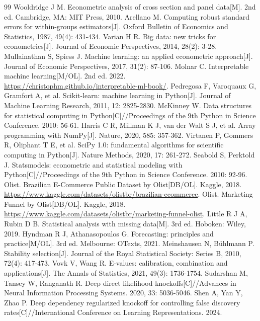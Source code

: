 \documentclass{sufethesismas}
\begin{document}
\begin{thebibliography}{99}
 Wooldridge J M. Econometric analysis of cross section and panel data[M]. 2nd ed. Cambridge, MA: MIT Press, 2010.
 Arellano M. Computing robust standard errors for within-groups estimators[J]. Oxford Bulletin of Economics and Statistics, 1987, 49(4): 431-434.
 Varian H R. Big data: new tricks for econometrics[J]. Journal of Economic Perspectives, 2014, 28(2): 3-28.
 Mullainathan S, Spiess J. Machine learning: an applied econometric approach[J]. Journal of Economic Perspectives, 2017, 31(2): 87-106.
 Molnar C. Interpretable machine learning[M/OL]. 2nd ed. 2022. \url{https://christophm.github.io/interpretable-ml-book/}.
 Pedregosa F, Varoquaux G, Gramfort A, et al. Scikit-learn: machine learning in Python[J]. Journal of Machine Learning Research, 2011, 12: 2825-2830.
 McKinney W. Data structures for statistical computing in Python[C]//Proceedings of the 9th Python in Science Conference. 2010: 56-61.
 Harris C R, Millman K J, van der Walt S J, et al. Array programming with NumPy[J]. Nature, 2020, 585: 357-362.
 Virtanen P, Gommers R, Oliphant T E, et al. SciPy 1.0: fundamental algorithms for scientific computing in Python[J]. Nature Methods, 2020, 17: 261-272.
 Seabold S, Perktold J. Statsmodels: econometric and statistical modeling with Python[C]//Proceedings of the 9th Python in Science Conference. 2010: 92-96.
 Olist. Brazilian E-Commerce Public Dataset by Olist[DB/OL]. Kaggle, 2018. \url{https://www.kaggle.com/datasets/olistbr/brazilian-ecommerce}.
 Olist. Marketing Funnel by Olist[DB/OL]. Kaggle, 2018. \url{https://www.kaggle.com/datasets/olistbr/marketing-funnel-olist}.
 Little R J A, Rubin D B. Statistical analysis with missing data[M]. 3rd ed. Hoboken: Wiley, 2019.
 Hyndman R J, Athanasopoulos G. Forecasting: principles and practice[M/OL]. 3rd ed. Melbourne: OTexts, 2021.
 Meinshausen N, Bühlmann P. Stability selection[J]. Journal of the Royal Statistical Society: Series B, 2010, 72(4): 417-473.
 Vovk V, Wang R. E-values: calibration, combination and applications[J]. The Annals of Statistics, 2021, 49(3): 1736-1754.
 Sudarshan M, Tansey W, Ranganath R. Deep direct likelihood knockoffs[C]//Advances in Neural Information Processing Systems. 2020, 33: 5036-5046.
 Shen A, Yan Y, Zhao P. Deep dependency regularized knockoff for controlling false discovery rates[C]//International Conference on Learning Representations. 2024.

\end{thebibliography}
\end{document}
